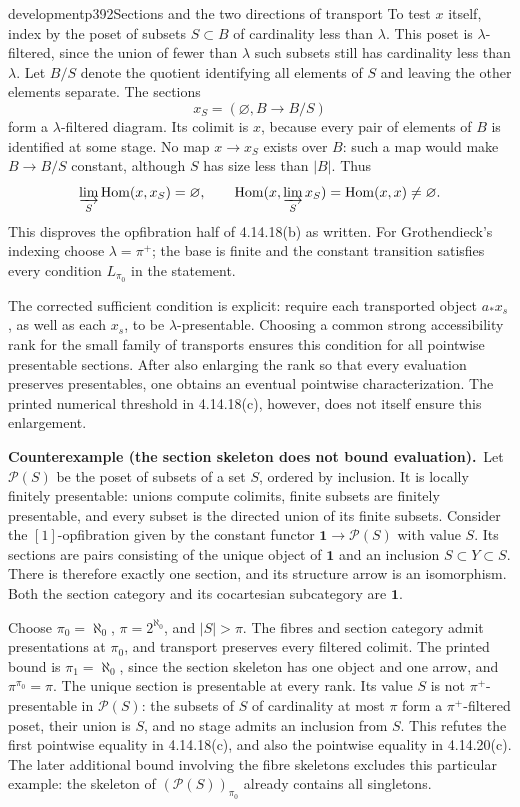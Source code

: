 \begin{dcomment}{development}{p392}{Sections and the two directions of transport}
To test $x$ itself, index by the poset of subsets $S\subset B$ of cardinality less than $\lambda$. This poset is $\lambda$-filtered, since the union of fewer than $\lambda$ such subsets still has cardinality less than $\lambda$. Let $B/S$ denote the quotient identifying all elements of $S$ and leaving the other elements separate. The sections
\[
 x_S=(\varnothing,B\longrightarrow B/S)
\]
form a $\lambda$-filtered diagram. Its colimit is $x$, because every pair of elements of $B$ is identified at some stage. No map $x\to x_S$ exists over $B$: such a map would make $B\to B/S$ constant, although $S$ has size less than $|B|$. Thus
\[
 \varinjlim_S\operatorname{Hom}(x,x_S)=\varnothing,
 \qquad
 \operatorname{Hom}(x,\varinjlim_Sx_S)=\operatorname{Hom}(x,x)\ne\varnothing.
\]
This disproves the opfibration half of 4.14.18(b) as written. For Grothendieck's indexing choose $\lambda=\pi^+$; the base is finite and the constant transition satisfies every condition $L_{\pi_0}$ in the statement.

The corrected sufficient condition is explicit: require each transported object $a_*x_s$, as well as each $x_s$, to be $\lambda$-presentable. Choosing a common strong accessibility rank for the small family of transports ensures this condition for all pointwise presentable sections. After also enlarging the rank so that every evaluation preserves presentables, one obtains an eventual pointwise characterization. The printed numerical threshold in 4.14.18(c), however, does not itself ensure this enlargement.

\textbf{Counterexample (the section skeleton does not bound evaluation).}\ours\ 
Let $\mathcal P(S)$ be the poset of subsets of a set $S$, ordered by inclusion. It is locally finitely presentable: unions compute colimits, finite subsets are finitely presentable, and every subset is the directed union of its finite subsets. Consider the $[1]$-opfibration given by the constant functor $\mathbf1\to\mathcal P(S)$ with value $S$. Its sections are pairs consisting of the unique object of $\mathbf1$ and an inclusion $S\subset Y\subset S$. There is therefore exactly one section, and its structure arrow is an isomorphism. Both the section category and its cocartesian subcategory are $\mathbf1$.

Choose $\pi_0=\aleph_0$, $\pi=2^{\aleph_0}$, and $|S|>\pi$. The fibres and section category admit presentations at $\pi_0$, and transport preserves every filtered colimit. The printed bound is $\pi_1=\aleph_0$, since the section skeleton has one object and one arrow, and $\pi^{\pi_0}=\pi$. The unique section is presentable at every rank. Its value $S$ is not $\pi^+$-presentable in $\mathcal P(S)$: the subsets of $S$ of cardinality at most $\pi$ form a $\pi^+$-filtered poset, their union is $S$, and no stage admits an inclusion from $S$. This refutes the first pointwise equality in 4.14.18(c), and also the pointwise equality in 4.14.20(c). The later additional bound involving the fibre skeletons excludes this particular example: the skeleton of $(\mathcal P(S))_{\pi_0}$ already contains all singletons.


\end{dcomment}
